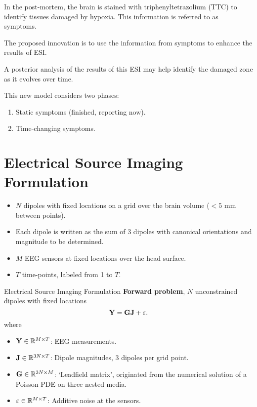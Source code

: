 In the post-mortem, the brain is stained with
triphenyltetrazolium (TTC)
to identify tissues damaged by hypoxia. This information is referred to as  {symptoms}.

 

The proposed innovation is to use the information from {symptoms} to enhance the results of ESI.

A posterior analysis of the results of this ESI may help identify the damaged zone as it evolves over time.

This new model considers two phases:
\begin{enumerate}
    \item Static symptoms (finished, reporting now).
    \item Time-changing symptoms.
\end{enumerate}
 



\section{Electrical Source Imaging Formulation}
\begin{itemize}
    \item $N$ dipoles with fixed locations on a grid over the brain volume ($<5$ mm between points).
    \item Each dipole is written as the sum of 3 dipoles with canonical orientations and magnitude to be determined.
    \item $M$ EEG sensors at fixed locations over the head surface.
    \item $T$ time-points, labeled from 1 to $T$.
\end{itemize}
 

 {Electrical Source Imaging Formulation}
\textbf{Forward problem}, $N$ unconstrained dipoles with fixed locations
\begin{equation}
\mathbf{Y} = \mathbf{G} \mathbf{J} + \varepsilon.
\end{equation}
where
\begin{itemize}
\item $\mathbf{Y} \in \mathbb{R}^{M \times T}$: EEG measurements.
\item $\mathbf{J} \in \mathbb{R}^{3N \times T}$: Dipole magnitudes, 3 dipoles per grid point.
\item $\mathbf{G} \in \mathbb{R}^{3N\times M}$: `Leadfield matrix', originated from the numerical solution of a Poisson PDE on three nested media.
\item $\varepsilon\in \mathbb{R}^{M\times T}$: Additive noise at the sensors.
\end{itemize}
 

